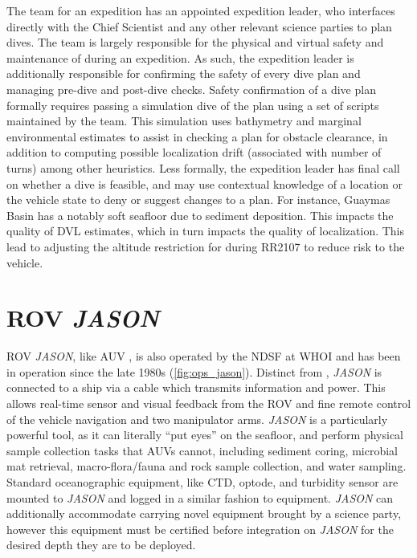 The \Sentry team for an expedition has an appointed expedition leader, who interfaces directly with the Chief Scientist and any other relevant science parties to plan \Sentry dives. The team is largely responsible for the physical and virtual safety and maintenance of \Sentry during an expedition. As such, the expedition leader is additionally responsible for confirming the safety of every dive plan and managing pre-dive and post-dive checks. Safety confirmation of a dive plan formally requires passing a simulation dive of the plan using a set of scripts maintained by the \Sentry team. This simulation uses bathymetry and marginal environmental estimates to assist in checking a plan for obstacle clearance, in addition to computing possible localization drift (associated with number of turns) among other heuristics. Less formally, the expedition leader has final call on whether a dive is feasible, and may use contextual knowledge of a location or the vehicle state to deny or suggest changes to a plan. For instance, Guaymas Basin has a notably soft seafloor due to sediment deposition. This impacts the quality of DVL estimates, which in turn impacts the quality of \Sentry localization. This lead to adjusting the altitude restriction for \Sentry during RR2107 to reduce risk to the vehicle.


\section{ROV \emph{JASON}}
ROV \emph{JASON}, like AUV \Sentry, is also operated by the NDSF at WHOI\autocite{ballard1993medea,yoerger1986jason,petitt2004power} and has been in operation since the late 1980s (\cref{fig:ops_jason}). Distinct from \Sentry, \emph{JASON} is connected to a ship via a cable which transmits information and power. This allows real-time sensor and visual feedback from the ROV and fine remote control of the vehicle navigation and two manipulator arms. \emph{JASON} is a particularly powerful tool, as it can literally ``put eyes'' on the seafloor, and perform physical sample collection tasks that AUVs cannot, including sediment coring, microbial mat retrieval, macro-flora/fauna and rock sample collection, and water sampling. Standard oceanographic equipment, like CTD, optode, and turbidity sensor are mounted to \emph{JASON} and logged in a similar fashion to \Sentry equipment. \emph{JASON} can additionally accommodate carrying novel equipment brought by a science party, however this equipment must be certified before integration on \emph{JASON} for the desired depth they are to be deployed. 

